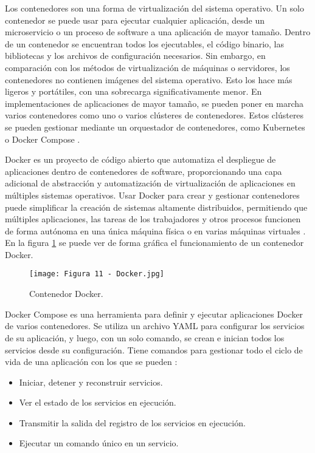Los contenedores son una forma de virtualización del sistema operativo. Un solo contenedor se puede usar para ejecutar cualquier aplicación, desde un microservicio o un proceso de software a una aplicación de mayor tamaño. Dentro de un contenedor se encuentran todos los ejecutables, el código binario, las bibliotecas y los archivos de configuración necesarios. Sin embargo, en comparación con los métodos de virtualización de máquinas o servidores, los contenedores no contienen imágenes del sistema operativo. Esto los hace más ligeros y portátiles, con una sobrecarga significativamente menor. En implementaciones de aplicaciones de mayor tamaño, se pueden poner en marcha varios contenedores como uno o varios clústeres de contenedores. Estos clústeres se pueden gestionar mediante un orquestador de contenedores, como Kubernetes o Docker Compose \citep{28}.

Docker es un proyecto de código abierto que automatiza el despliegue de aplicaciones dentro de contenedores de software, proporcionando una capa adicional de abstracción y automatización de virtualización de aplicaciones en múltiples sistemas operativos. Usar Docker para crear y gestionar contenedores puede simplificar la creación de sistemas altamente distribuidos, permitiendo que múltiples aplicaciones, las tareas de los trabajadores y otros procesos funcionen de forma autónoma en una única máquina física o en varias máquinas virtuales \citep{29}. En la figura \ref{fig:11} se puede ver de forma gráfica el funcionamiento de un contenedor Docker.

\begin{figure}[h]
\centering
\texttt{[image: Figura 11 - Docker.jpg]}
\caption[Contenedor Docker]{Contenedor Docker. \footnotemark}
\label{fig:11}
\end{figure}

Docker Compose es una herramienta para definir y ejecutar aplicaciones Docker de varios contenedores. Se utiliza un archivo YAML para configurar los servicios de su aplicación, y luego, con un solo comando, se crean e inician todos los servicios desde su configuración. Tiene comandos para gestionar todo el ciclo de vida de una aplicación con los que se pueden \citep{30}:

\begin{itemize}
	\item Iniciar, detener y reconstruir servicios.
	\item Ver el estado de los servicios en ejecución.
	\item Transmitir la salida del registro de los servicios en ejecución.
	\item Ejecutar un comando único en un servicio.
\end{itemize}
